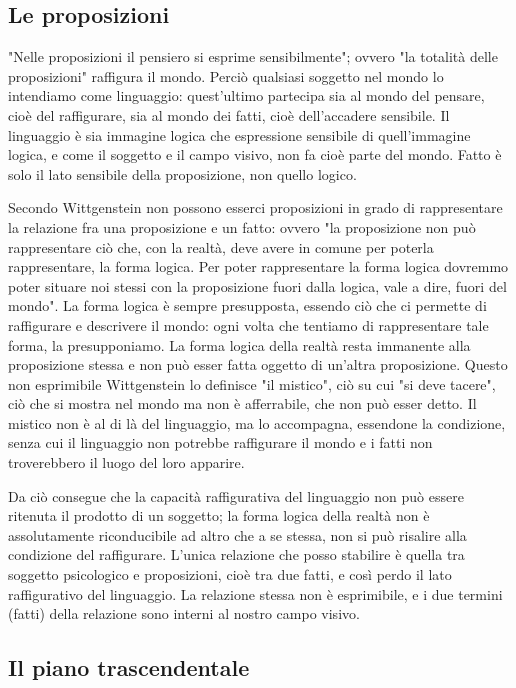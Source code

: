 \subsection{Le proposizioni}

"Nelle proposizioni il pensiero si esprime
sensibilmente"; ovvero "la totalità delle
proposizioni" raffigura il mondo. Perciò qualsiasi
soggetto nel mondo lo intendiamo come linguaggio:
quest'ultimo partecipa sia al mondo del pensare,
cioè del raffigurare, sia al mondo dei fatti, cioè
dell'accadere sensibile. Il linguaggio è sia immagine
logica che espressione sensibile di quell'immagine
logica, e come il soggetto e il campo visivo, non fa
cioè parte del mondo. Fatto è solo il lato sensibile
della proposizione, non quello logico.

Secondo Wittgenstein non possono esserci proposizioni
in grado di rappresentare la relazione fra una
proposizione e un fatto: ovvero "la proposizione non
può rappresentare ciò che, con la realtà, deve avere
in comune per poterla rappresentare, la forma logica.
Per poter rappresentare la forma logica dovremmo
poter situare noi stessi con la proposizione fuori
dalla logica, vale a dire, fuori del mondo".
La forma logica è sempre presupposta, essendo ciò
che ci permette di raffigurare e descrivere il
mondo: ogni volta che tentiamo di rappresentare
tale forma, la presupponiamo. La forma logica
della realtà resta immanente alla proposizione
stessa e non può esser fatta oggetto di un'altra
proposizione. Questo non esprimibile Wittgenstein
lo definisce "il mistico", ciò su cui "si deve
tacere", ciò che si mostra nel mondo ma non
è afferrabile, che non può esser detto.
Il mistico non è al di là del linguaggio, ma
lo accompagna, essendone la condizione, senza
cui il linguaggio non potrebbe raffigurare il mondo
e i fatti non troverebbero il luogo del loro
apparire.

Da ciò consegue che la capacità raffigurativa
del linguaggio non può essere ritenuta il
prodotto di un soggetto; la forma logica della
realtà non è assolutamente riconducibile ad
altro che a se stessa, non si può risalire
alla condizione del raffigurare.
L'unica relazione che posso stabilire è quella
tra soggetto psicologico e proposizioni,
cioè tra due fatti, e così perdo il
lato raffigurativo del linguaggio.
La relazione stessa non è esprimibile, e i due
termini (fatti) della relazione sono interni
al nostro campo visivo.

\subsection{Il piano trascendentale}

